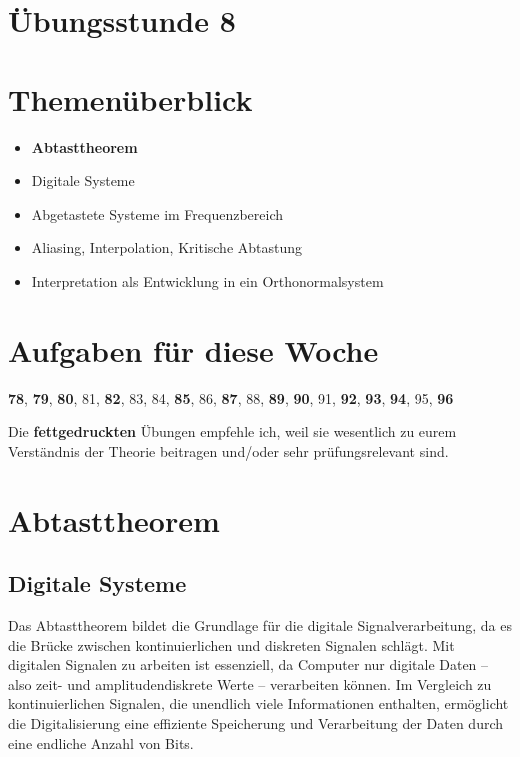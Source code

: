 \documentclass[11pt]{article}
\begin{document}
\thispagestyle{firstpage}

\setlength{\headheight}{1 \baselineskip}  %
\setlength{\parindent}{0pt}  %
\setlength{\parskip}{\baselineskip}  %

\vspace*{-5px}
\section*{Übungsstunde 8}

\section*{Themenüberblick}
\begin{itemize}
    \item \textbf{Abtasttheorem}
    \item[] Digitale Systeme
    \item[] Abgetastete Systeme im Frequenzbereich
    \item[] Aliasing, Interpolation, Kritische Abtastung
    \item[] Interpretation als Entwicklung in ein Orthonormalsystem
\end{itemize}

\section*{Aufgaben für diese Woche}
\vspace{-0.5cm}

\textbf{78}, \textbf{79}, \textbf{80}, 81, \textbf{82}, 83, 84, \textbf{85}, 86, \textbf{87}, 88, \textbf{89}, \textbf{90}, 91, \textbf{92}, \textbf{93}, \textbf{94}, 95, \textbf{96}\\
\vspace{-0.5cm}

Die \textbf{fettgedruckten} Übungen empfehle ich, weil sie wesentlich zu eurem Verständnis der Theorie beitragen und/oder sehr prüfungsrelevant sind.

\vfill \null
\pagebreak

\section*{Abtasttheorem}
\vspace*{-0.5cm}

\subsection*{Digitale Systeme}
\vspace*{-0.5cm}
Das Abtasttheorem bildet die Grundlage für die digitale Signalverarbeitung, da es die Brücke zwischen kontinuierlichen und diskreten Signalen schlägt. Mit digitalen Signalen zu arbeiten ist essenziell, da Computer nur digitale Daten – also zeit- und amplitudendiskrete Werte – verarbeiten können. Im Vergleich zu kontinuierlichen Signalen, die unendlich viele Informationen enthalten, ermöglicht die Digitalisierung eine effiziente Speicherung und Verarbeitung der Daten durch eine endliche Anzahl von Bits.
\end{document}
